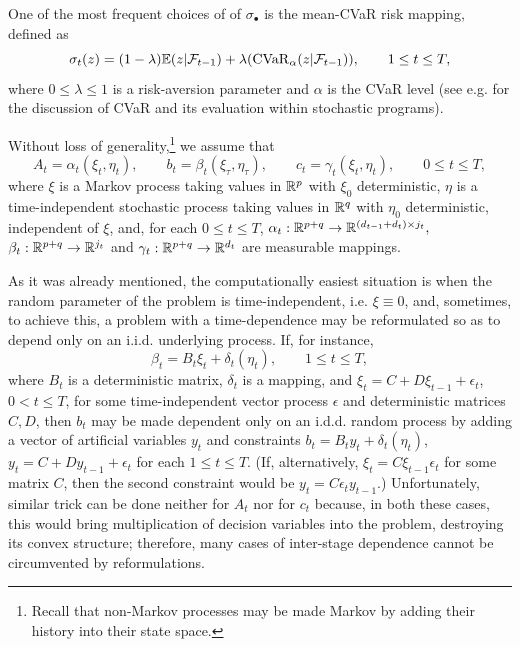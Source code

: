 \documentclass{article}              %
\begin{document}
One of the most frequent choices of of $\sigma_{\bullet}$ is the
mean-CVaR risk mapping, defined as 
\[
\sigma_{t}(z)=(1-\lambda)\mathbb{E}(z|\mathcal{F}_{t-1})+\lambda(\mathrm{CVaR}_{\alpha}(z|\mathcal{F}_{t-1})),\qquad1\leq t\leq T,
\]
where $0\leq\lambda\leq1$ is a risk-aversion parameter and $\alpha$
is the CVaR level (see e.g. \cite{rockafellar2002conditional} for
the discussion of CVaR and its evaluation within stochastic programs).

Without loss of generality,\footnote{Recall that non-Markov processes may be made Markov by adding their
history into their state space.} we assume that
\begin{equation}
A_{t}=\mathcal{\alpha}_{t}(\xi_{t},\eta_{t}),\qquad b_{t}=\beta_{t}(\xi_{\tau},\eta_{\tau}),\qquad c_{t}=\gamma_{t}(\xi_{t},\eta_{t}),\qquad0\leq t\leq T,\label{eq:exi}
\end{equation}
where $\xi$ is a Markov process taking values in $\mathbb{R}^{p}$ with
$\xi_{0}$ deterministic, $\eta$ is a time-independent stochastic
process taking values in $\mathbb{R}^{q}$ with $\eta_{0}$ deterministic,
independent of $\xi$, and, for each $0\leq t\leq T$, $\alpha_{t}:\mathbb{R}^{p+q}\rightarrow\mathbb{R}^{(d_{t-1}+d_{t})\times j_{t}},$
 $\beta_{t}:\mathbb{R}^{p+q}\rightarrow\mathbb{R}^{j_{t}}$ and $\gamma_{t}:\mathbb{R}^{p+q}\rightarrow\mathbb{R}^{d_{t}}$
are measurable mappings.

As it was already mentioned, the computationally easiest situation is when the random parameter
of the problem is time-independent, i.e. $\xi\equiv0$, and, sometimes, to achieve this,
a problem with a time-dependence may be reformulated so as to depend
only on an i.i.d. underlying process. If, for instance, 
\begin{equation}
\beta_{t}=B_{t}\xi_{t}+\delta_{t}(\eta_{t}),\qquad1\leq t\leq T,\label{eq:bbd}
\end{equation}
where $B_{t}$ is a deterministic matrix, $\delta_{t}$ is a mapping,
and $\xi_{t}=C+D\xi_{t-1}+\epsilon_{t}$, $0<t\leq T$, for some time-independent
vector process $\epsilon$ and deterministic matrices $C,D$, then
$b_{t}$ may be made dependent only on an i.d.d. random process by
adding a vector of artificial variables $y_{t}$ and constraints
$b_{t}=B_{t}y_{t}+\delta_{t}(\eta_{t})$, $y_{t}=C+Dy_{t-1}+\epsilon_{t}$
for each $1\leq t\leq T$. (If, alternatively, $\xi_{t}=C\xi_{t-1}\epsilon_{t}$
for some matrix $C$, then the second constraint would be $y_{t}=C\epsilon_{t}y_{t-1}$.)
Unfortunately, similar trick can be done neither for $A_{t}$ nor
for $c_{t}$ because, in both these cases, this would bring multiplication
of decision variables into the problem, destroying its convex structure;
therefore, many cases of inter-stage dependence cannot be circumvented
by reformulations.
\end{document}

